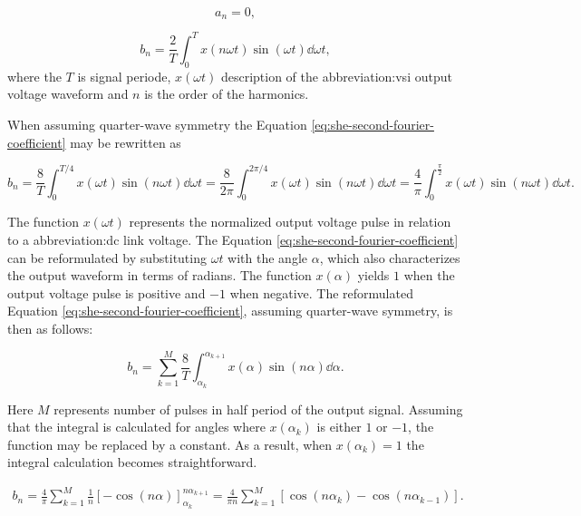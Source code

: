\documentclass[a4paper, twoside, 11pt]{article}
\begin{document}
            \begin{equation}
                a_n = 0,
                \label{eq:she-first-fourier-coefficient-zero}
            \end{equation}

            \begin{equation}
                b_n = \frac{2}{T} \int_{0}^{T} x(n\omega t)\sin(\omega t) \dd \omega t,
                \label{eq:she-second-fourier-coefficient}
            \end{equation}
            where the $T$ is signal periode, $x(\omega t)$ description of the \gls{abbreviation:vsi} output voltage waveform and $n$ is the order of the harmonics.

            When assuming quarter-wave symmetry the Equation \ref{eq:she-second-fourier-coefficient} may be rewritten as

            \begin{equation}
                b_n = \frac{8}{T} \int_{0}^{T/4} x(\omega t) \sin (n\omega t) \dd \omega t = \frac{8}{2 \pi} \int_{0}^{2 \pi/4} x(\omega t) \sin (n\omega t) \dd \omega t = \frac{4}{\pi} \int_{0}^{\frac{\pi}{2}} x(\omega t) \sin (n\omega t) \dd \omega t.
            \end{equation}

            The function $x(\omega t)$ represents the normalized output voltage pulse in relation to a \gls{abbreviation:dc} link voltage. The Equation \ref{eq:she-second-fourier-coefficient} can be reformulated by substituting $\omega t$ with the angle $\alpha$, which also characterizes the output waveform in terms of radians. The function $x(\alpha)$ yields $1$ when the output voltage pulse is positive and $-1$ when negative. The reformulated Equation \ref{eq:she-second-fourier-coefficient}, assuming quarter-wave symmetry, is then as follows:

            \begin{equation}
                b_n = \sum_{k=1}^{M} \frac{8}{T} \int_{\alpha_k}^{\alpha_{k+1}} x(\alpha) \sin(n\alpha) \dd \alpha.
            \end{equation}

           Here $M$ represents number of pulses in half period of the output signal. Assuming that the integral is calculated for angles where $x(\alpha_k)$ is either $1$ or $-1$, the function may be replaced by a constant. As a result, when $x(\alpha_k) = 1$ the integral calculation becomes straightforward.

           \begin{equation}
               \begin{gathered}
                    b_n = \frac{4}{\pi} \sum_{k=1}^{M} \frac{1}{n} \left[ - \cos(n\alpha) \right]_{\alpha_k}^{n\alpha_{k+1}}
                    = \frac{4}{\pi n} \sum_{k=1}^{M} \left[ \cos(n\alpha_k) - \cos(n\alpha_{k-1}) \right].
               \end{gathered}
               \label{eq:she-equation-integration}
           \end{equation}
\end{document}
